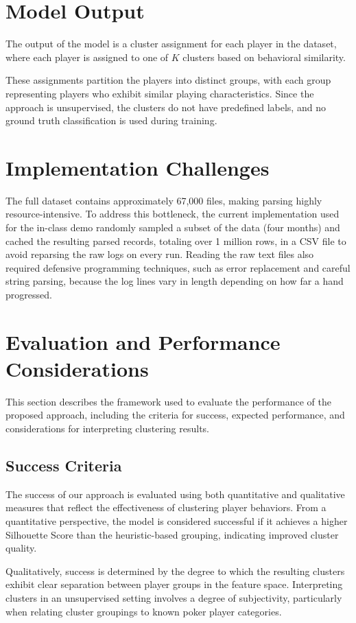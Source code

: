 \documentclass[11pt]{extarticle}
\begin{document}
\section{Model Output}
The output of the model is a cluster assignment for each player in the dataset, where each player is assigned to one of \( K \) clusters based on behavioral similarity.

These assignments partition the players into distinct groups, with each group representing players who exhibit similar playing characteristics. Since the approach is unsupervised, the clusters do not have predefined labels, and no ground truth classification is used during training.

\section{Implementation Challenges}
The full dataset contains approximately 67,000 files, making parsing highly resource-intensive. To address this bottleneck, the current implementation used for the in-class demo randomly sampled a subset of the data (four months) and cached the resulting parsed records, totaling over 1 million rows, in a CSV file to avoid reparsing the raw logs on every run. Reading the raw text files also required defensive programming techniques, such as error replacement and careful string parsing, because the log lines vary in length depending on how far a hand progressed.

\section{Evaluation and Performance Considerations}
This section describes the framework used to evaluate the performance of the proposed approach, including the criteria for success, expected performance, and considerations for interpreting clustering results.

\subsection{Success Criteria}
The success of our approach is evaluated using both quantitative and qualitative measures that reflect the effectiveness of clustering player behaviors. From a quantitative perspective, the model is considered successful if it achieves a higher Silhouette Score than the heuristic-based grouping, indicating improved cluster quality.

Qualitatively, success is determined by the degree to which the resulting clusters exhibit clear separation between player groups in the feature space. Interpreting clusters in an unsupervised setting involves a degree of subjectivity, particularly when relating cluster groupings to known poker player categories.
\end{document}
